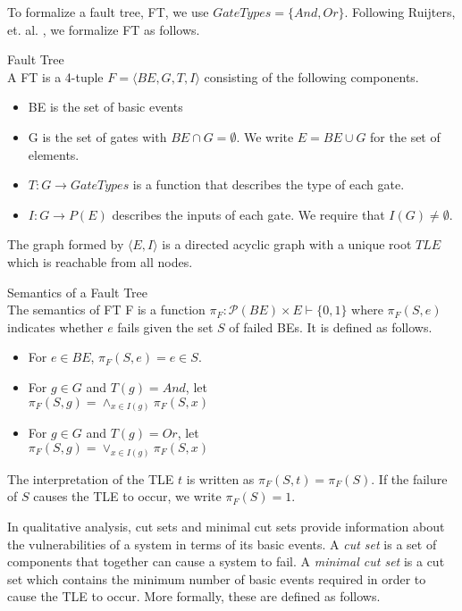 To formalize a fault tree, FT, we use $GateTypes = \{And, Or\}$. Following Ruijters, et. al. \cite{RuijtersSurvey}, we formalize FT as follows. \\

\begin{definition}Fault Tree\\ 
A FT is a 4-tuple $F = \langle BE, G, T, I \rangle$ consisting of the following components. 
\begin{itemize}
\item BE is the set of basic events
\item G is the set of gates with $BE \cap G = \emptyset$. We write $E = BE \cup G$ for the set of elements.
\item $T: G \to GateTypes$ is a function that describes the type of each gate.
\item $I: G \to P(E)$ describes the inputs of each gate. We require that $I(G) \neq \emptyset$.
\end{itemize}
\end{definition}

The graph formed by $\langle E, I \rangle$ is a directed acyclic graph with a unique root $TLE$ which is reachable from all nodes. \\

\begin{definition}Semantics of a Fault Tree\\  
The semantics of FT F is a function $\pi_F : \mathcal{P}(BE) \times E \vdash \{0,1\}$ where $\pi_F(S, e)$ indicates whether $e$ fails given the set $S$ of failed BEs. It is defined as follows. 
\begin{itemize}
\item For $e \in BE$, $\pi_F(S,e) = e \in S$.
\item For $g \in G$ and $T(g) = And$, let\\ $\pi_F(S,g) = \land_{x \in I(g)} \pi_F(S, x)$
\item For $g \in G$ and $T(g) = Or$, let\\ $\pi_F(S,g) = \lor_{x \in I(g)} \pi_F(S, x)$ \\
\end{itemize}
\end{definition}

The interpretation of the TLE $t$ is written as $\pi_F(S,t) = \pi_F(S)$. If the failure of $S$ causes the TLE to occur, we write $\pi_F(S) = 1$. 

In qualitative analysis, cut sets and minimal cut sets provide information about the vulnerabilities of a system in terms of its basic events. A \textit{cut set} is a set of components that together can cause a system to fail. A \textit{minimal cut set} is a cut set which contains the minimum number of basic events required in order to cause the TLE to occur. More formally, these are defined as follows. \\


